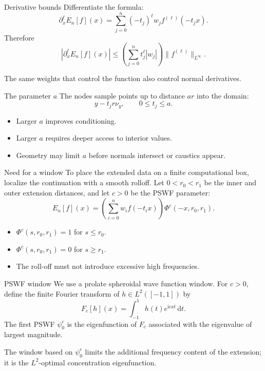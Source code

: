 \documentclass[aspectratio=169,11pt]{beamer}
\newcommand{\dd}{\,\mathrm d}
\newcommand{\ii}{\mathrm i}
\begin{document}
\begin{frame}{Derivative bounds}
\small
Differentiate the formula:
\[
  \partial_x^\ell E_n[f](x)
  =
  \sum_{j=0}^n(-t_j)^\ell w_j
  f^{(\ell)}(-t_jx).
\]
Therefore
\[
  |\partial_x^\ell E_n[f](x)|
  \le
  \left(\sum_{j=0}^nt_j^\ell|w_j|\right)
  \|f^{(\ell)}\|_{L^\infty}.
\]

\vspace{2mm}
The same weights that control the function also control normal derivatives.
\end{frame}

\begin{frame}{The parameter $a$}
\small
The nodes sample points up to distance $a r$ into the domain:
\[
  y-t_jr\nu_y,\qquad 0\le t_j\le a.
\]

\begin{itemize}
  \item Larger $a$ improves conditioning.
  \item Larger $a$ requires deeper access to interior values.
  \item Geometry may limit $a$ before normals intersect or caustics appear.
\end{itemize}
\end{frame}

\begin{frame}{Need for a window}
\small
To place the extended data on a finite computational box, localize the
continuation with a smooth rolloff. Let $0<r_0<r_1$ be the inner and outer
extension distances, and let $c>0$ be the PSWF parameter:
\[
  E_n[f](x)=
  \left(\sum_{i=0}^nw_if(-t_ix)\right)\Phi^c(-x,r_0,r_1).
\]

\begin{itemize}
  \item $\Phi^c(s,r_0,r_1)=1$ for $s\le r_0$.
  \item $\Phi^c(s,r_0,r_1)=0$ for $s\ge r_1$.
  \item The roll-off must not introduce excessive high frequencies.
\end{itemize}
\end{frame}

\begin{frame}{PSWF window}
\small
We use a prolate spheroidal wave function window.
For $c>0$, define the finite Fourier transform of $h\in L^2([-1,1])$ by
\[
  F_c[h](x)=\int_{-1}^1h(t)e^{\ii cxt}\dd t.
\]
The first PSWF $\psi_0^c$ is the eigenfunction of $F_c$ associated with the
eigenvalue of largest magnitude.

\vspace{2mm}
The window based on $\psi_0^c$ limits the additional frequency content of the
extension; it is the $L^2$-optimal concentration eigenfunction.
\end{frame}
\end{document}
